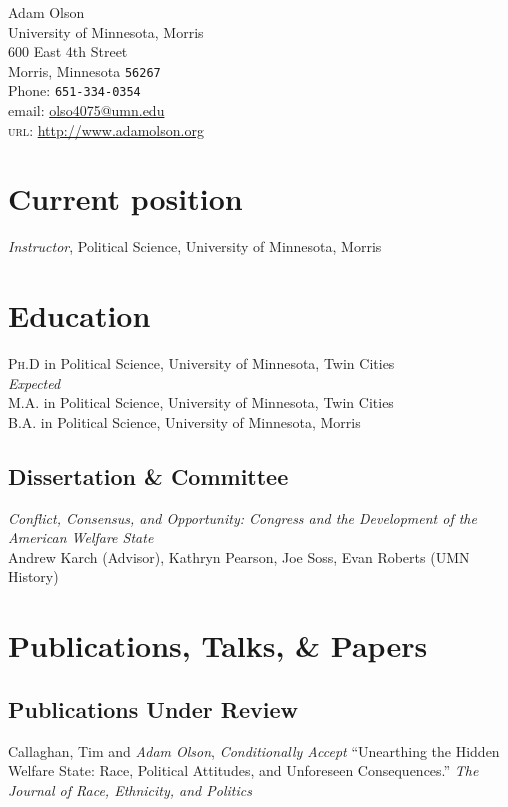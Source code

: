 \documentclass[12pt, letter]{article}
\newcommand{\years}[1]{\marginnote{\normalsize #1}}
\begin{document}
{\LARGE Adam Olson}\\[1cm]
University of Minnesota, Morris\\
600 East 4th Street \\
Morris, Minnesota \texttt{56267} \\[.2cm]
Phone: \texttt{651-334-0354}\\
email: \href{mailto:olso4075@umn.edu}{olso4075@umn.edu}\\
\textsc{url}: \href{http://www.adamolson.org}{http://www.adamolson.org} 

\section*{Current position}
\emph{Instructor}, Political Science, University of Minnesota, Morris

\section*{Education}
\noindent
\years{2016}\textsc{Ph.D} in Political Science, University of Minnesota, Twin Cities\\
\textit{Expected}\\
\years{2014}\textsc{M.A.} in Political Science, University of Minnesota, Twin Cities\\
\years{2010}\textsc{B.A.} in Political Science, University of Minnesota, Morris

\subsection*{Dissertation \& Committee}
\emph{Conflict, Consensus, and Opportunity: Congress and the Development of the American Welfare State} \\
Andrew Karch (Advisor), Kathryn Pearson, Joe Soss, Evan Roberts (UMN History)

\section*{Publications, Talks, \& Papers}
\subsection*{Publications Under Review}
\noindent
Callaghan, Tim and \emph{Adam Olson}, \textit{Conditionally Accept} ``Unearthing the Hidden Welfare State: Race, Political Attitudes, and Unforeseen Consequences.'' \textit{The Journal of Race, Ethnicity, and Politics}
\end{document}
